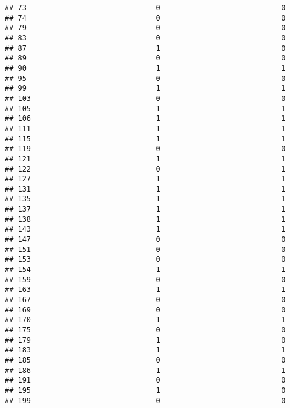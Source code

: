 \documentclass[
]{article}
\begin{document}
\begin{verbatim}
## 73                              0                            0
## 74                              0                            0
## 79                              0                            0
## 83                              0                            0
## 87                              1                            0
## 89                              0                            0
## 90                              1                            1
## 95                              0                            0
## 99                              1                            1
## 103                             0                            0
## 105                             1                            1
## 106                             1                            1
## 111                             1                            1
## 115                             1                            1
## 119                             0                            0
## 121                             1                            1
## 122                             0                            1
## 127                             1                            1
## 131                             1                            1
## 135                             1                            1
## 137                             1                            1
## 138                             1                            1
## 143                             1                            1
## 147                             0                            0
## 151                             0                            0
## 153                             0                            0
## 154                             1                            1
## 159                             0                            0
## 163                             1                            1
## 167                             0                            0
## 169                             0                            0
## 170                             1                            1
## 175                             0                            0
## 179                             1                            0
## 183                             1                            1
## 185                             0                            0
## 186                             1                            1
## 191                             0                            0
## 195                             1                            0
## 199                             0                            0

\end{verbatim}
\end{document}
